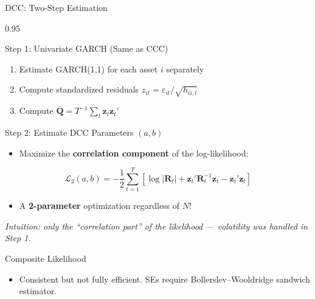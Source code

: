\documentclass[9pt, aspectratio=169, t]{beamer}
\begin{document}
\begin{frame}{DCC: Two-Step Estimation}
    \begin{cminipage}{0.95\textwidth}
    \vspace{-2mm}
    {\scriptsize
    \begin{block}{Step 1: Univariate GARCH (Same as CCC)}
        \begin{enumerate}\setlength{\itemsep}{0pt}
            \item Estimate GARCH(1,1) for each asset $i$ separately
            \item Compute standardized residuals $z_{it} = \varepsilon_{it}/\sqrt{h_{ii,t}}$
            \item Compute $\bar{\mathbf{Q}} = T^{-1}\sum_t \mathbf{z}_t\mathbf{z}_t'$
        \end{enumerate}
    \end{block}
    \vspace{-1mm}
    \begin{block}{Step 2: Estimate DCC Parameters $(a, b)$}
        \begin{itemize}\setlength{\itemsep}{0pt}
            \item Maximize the \textbf{correlation component} of the log-likelihood:
        \end{itemize}
        \vspace{-2mm}
        \[
            \mathcal{L}_2(a,b) = -\frac{1}{2}\sum_{t=1}^T \left[ \log|\mathbf{R}_t| + \mathbf{z}_t'\mathbf{R}_t^{-1}\mathbf{z}_t - \mathbf{z}_t'\mathbf{z}_t \right]
        \]
        \vspace{-3mm}
        \begin{itemize}\setlength{\itemsep}{0pt}
            \item A \textbf{2-parameter} optimization regardless of $N$!
        \end{itemize}
        \textit{Intuition: only the ``correlation part'' of the likelihood --- volatility was handled in Step 1.}
    \end{block}
    \vspace{-1mm}
    \begin{alertblock}{Composite Likelihood}
        \begin{itemize}\setlength{\itemsep}{0pt}
            \item Consistent but not fully efficient. SEs require Bollerslev--Wooldridge sandwich estimator.
        \end{itemize}
    \end{alertblock}
    }
    \end{cminipage}
\end{frame}
\end{document}
